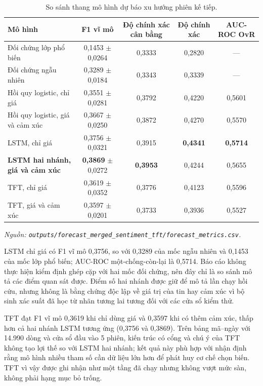 \begin{table}[H]
  \centering
  \caption{So sánh thang mô hình dự báo xu hướng phiên kế tiếp.}
  \label{tab:ket-qua}
  \begin{tabular}{l c c c c}
    \toprule
    Mô hình & F1 vĩ mô & Độ chính xác cân bằng & Độ chính xác & AUC-ROC OvR \\
    \midrule
    Đối chứng lớp phổ biến & 0,1453 $\pm$ 0,0264 & 0,3333 & 0,2820 & --- \\
    Đối chứng ngẫu nhiên & 0,3289 $\pm$ 0,0184 & 0,3343 & 0,3339 & --- \\
    Hồi quy logistic, chỉ giá & 0,3551 $\pm$ 0,0281 & 0,3792 & 0,4220 & 0,5601 \\
    Hồi quy logistic, giá và cảm xúc & 0,3667 $\pm$ 0,0250 & 0,3872 & 0,4270 & 0,5570 \\
    LSTM, chỉ giá & 0,3756 $\pm$ 0,0321 & 0,3915 & \textbf{0,4341} & \textbf{0,5714} \\
    \textbf{LSTM hai nhánh, giá và cảm xúc} & \textbf{0,3869} $\pm$ 0,0272 & \textbf{0,3953} & 0,4244 & 0,5655 \\
    TFT, chỉ giá & 0,3619 $\pm$ 0,0352 & 0,3776 & 0,4123 & 0,5596 \\
    TFT, giá và cảm xúc & 0,3597 $\pm$ 0,0201 & 0,3733 & 0,3936 & 0,5527 \\
    \bottomrule
  \end{tabular}
\noindent\textit{Nguồn: \texttt{outputs/forecast\_merged\_sentiment\_tft/forecast\_metrics.csv}.}
\end{table}

LSTM chỉ giá có F1 vĩ mô 0,3756, so với 0,3289 của mốc ngẫu nhiên và 0,1453 của
mốc lớp phổ biến; AUC-ROC một-chống-còn-lại là 0,5714. Báo cáo không thực hiện
kiểm định ghép cặp với hai mốc đối chứng, nên đây chỉ là so sánh mô tả các điểm
quan sát được. Điểm số hai nhánh được giữ để mô tả lần chạy hồi cứu, nhưng không
là bằng chứng độc lập về giá trị của tin hay cảm xúc vì bộ sinh xác suất đã học từ
nhãn tương lai tương đối với các cửa sổ kiểm thử.

TFT đạt F1 vĩ mô 0,3619 khi chỉ dùng giá và 0,3597 khi có thêm cảm xúc, thấp hơn
cả hai nhánh LSTM tương ứng (0,3756 và 0,3869). Trên bảng mã--ngày với 14.990
dòng và cửa sổ đầu vào 5 phiên, kiến trúc có cổng và chú ý của TFT không tạo lợi
thế so với LSTM hai nhánh; kết quả này phù hợp với nhận định rằng mô hình nhiều
tham số cần dữ liệu lớn hơn để phát huy cơ chế chọn biến. TFT vì vậy được ghi nhận
như một tầng đã chạy nhưng không vượt mức sàn, không phải hạng mục bỏ trống.

